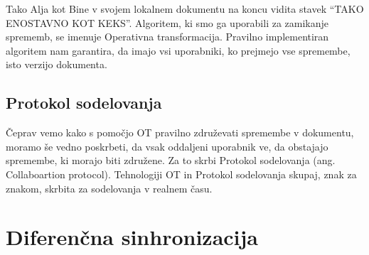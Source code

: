\documentclass[a4paper, 12pt, twoside]{book}
\begin{document}
Tako Alja kot Bine v svojem lokalnem dokumentu na koncu vidita stavek “TAKO ENOSTAVNO KOT KEKS”. Algoritem, ki smo ga uporabili za zamikanje sprememb, se imenuje Operativna transformacija. Pravilno implementiran algoritem nam garantira, da imajo vsi uporabniki, ko prejmejo vse spremembe, isto verzijo dokumenta.

\subsection{Protokol sodelovanja}

Čeprav vemo kako s pomočjo OT pravilno združevati spremembe v dokumentu, moramo še vedno poskrbeti, da vsak oddaljeni uporabnik ve, da obstajajo spremembe, ki morajo biti združene. Za to skrbi Protokol sodelovanja (ang. Collaboartion protocol). Tehnologiji OT in Protokol sodelovanja skupaj, znak za znakom, skrbita za sodelovanja v realnem času.

\section{Diferenčna sinhronizacija}
\end{document}
